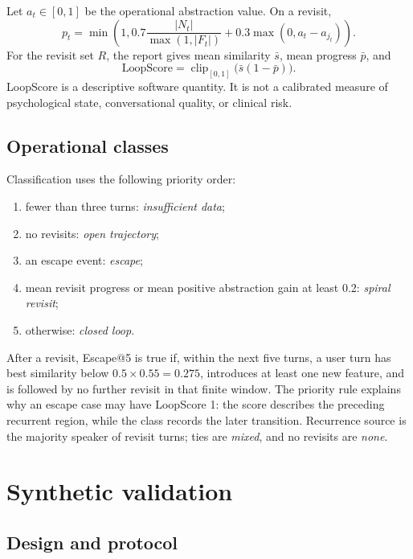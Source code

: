 \documentclass[11pt]{article}
\begin{document}
Let $a_t\in[0,1]$ be the operational abstraction value. On a revisit,
\begin{equation}
p_t=\min\left(1,0.7\frac{|N_t|}{\max(1,|F_t|)}+
0.3\max(0,a_t-a_{j_t})\right).
\end{equation}
For the revisit set $R$, the report gives mean similarity $\bar{s}$, mean
progress $\bar{p}$, and
\begin{equation}
\mathrm{LoopScore}=\operatorname{clip}_{[0,1]}\bigl(\bar{s}(1-\bar{p})\bigr).
\end{equation}
LoopScore is a descriptive software quantity. It is not a calibrated measure
of psychological state, conversational quality, or clinical risk.

\subsection{Operational classes}

Classification uses the following priority order:

\begin{enumerate}
  \item fewer than three turns: \emph{insufficient data};
  \item no revisits: \emph{open trajectory};
  \item an escape event: \emph{escape};
  \item mean revisit progress or mean positive abstraction gain at least 0.2:
        \emph{spiral revisit};
  \item otherwise: \emph{closed loop}.
\end{enumerate}

After a revisit, Escape@5 is true if, within the next five turns, a user turn
has best similarity below $0.5\times0.55=0.275$, introduces at least one new
feature, and is followed by no further revisit in that finite window. The
priority rule explains why an escape case may have LoopScore 1: the score
describes the preceding recurrent region, while the class records the later
transition. Recurrence source is the majority speaker of revisit turns; ties
are \emph{mixed}, and no revisits are \emph{none}.

\section{Synthetic validation}

\subsection{Design and protocol}
\end{document}
